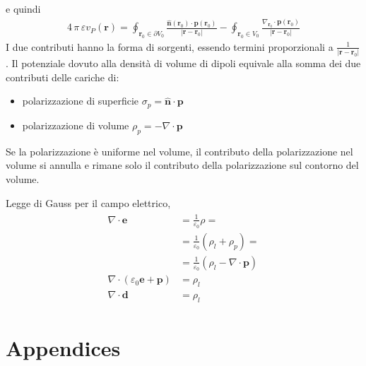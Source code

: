 \documentclass[letterpaper,10pt,english]{jupyterBook}
\begin{document}
\sphinxAtStartPar
e quindi
\begin{equation*}
\begin{split}4 \, \pi \, \varepsilon v_P(\mathbf{r}) = \oint_{\mathbf{r}_0 \in \partial V_0} \frac{\hat{\mathbf{n}}(\mathbf{r}_0) \cdot \mathbf{p}(\mathbf{r}_0)}{|\mathbf{r}-\mathbf{r}_0|} - \oint_{\mathbf{r}_0 \in V_0} \frac{\nabla_{\mathbf{r}_0} \cdot \mathbf{p}(\mathbf{r}_0)}{|\mathbf{r} - \mathbf{r}_0|}\end{split}
\end{equation*}
\sphinxAtStartPar
I due contributi hanno la forma di sorgenti, essendo termini proporzionali a \(\frac{1}{|\mathbf{r}-\mathbf{r}_0|}\).
Il potenziale dovuto alla densità di volume di dipoli equivale alla somma dei due contributi delle cariche di:
\begin{itemize}
\item {} 
\sphinxAtStartPar
polarizzazione di superficie \(\sigma_p =   \hat{\mathbf{n}} \cdot \mathbf{p}\)

\item {} 
\sphinxAtStartPar
polarizzazione di volume     \(\rho_p   = - \nabla \cdot \mathbf{p}\)

\end{itemize}

\sphinxAtStartPar
{} Se la polarizzazione è uniforme nel volume, il contributo della polarizzazione nel volume si annulla e rimane solo il contributo della polarizzazione sul contorno del volume.

\sphinxAtStartPar
{} Legge di Gauss per il campo elettrico,
\begin{equation*}
\begin{split}\begin{aligned}
  \nabla \cdot \mathbf{e} & = \frac{1}{\varepsilon_0} \rho = \\
                          & = \frac{1}{\varepsilon_0} \left( \rho_l + \rho_p \right) = \\
                          & = \frac{1}{\varepsilon_0} \left( \rho_l - \nabla \cdot \mathbf{p} \right) \\
  \nabla \cdot \left( \varepsilon_0 \mathbf{e} + \mathbf{p} \right) & = \rho_l \\
  \nabla \cdot  \mathbf{d} & = \rho_l
\end{aligned}\end{split}
\end{equation*}
\sphinxstepscope


\part{Appendices}
\end{document}
